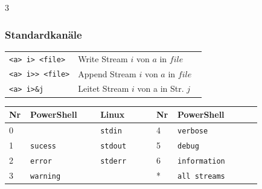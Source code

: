 \documentclass[
11pt,
footheight=40pt
]{scrartcl}
\newif\ifdateisysteme \dateisystemetrue
\newif\ifkanaele \kanaeletrue
\begin{document}
\begin{paracol}{3}
	\ifkanaele 
	\subsubsection*{Standardkanäle}
		\begin{tabular}{p{0.35\linewidth} p{0.65\linewidth}}
		\rowcolor{lightpeach} \texttt{<a> i> <file>} & Write Stream $i$ von $a$ in $file$ \\
		\rowcolor{lightpeach} \texttt{<a> i>> <file>} & Append Stream $i$ von $a$ in $file$ \\
		\texttt{<a> i>\&j} & Leitet Stream $i$ von a in Str. $j$ \\
	\end{tabular}

	\begin{tabular}{p{0.04\linewidth} p{0.25\linewidth} p{0.20\linewidth} || p{0.04\linewidth} p{0.30\linewidth}}
		\textbf{Nr} & \textbf{PowerShell}  & \textbf{Linux} & \textbf{Nr} & \textbf{PowerShell} \\ \hline
	    \rowcolor{lightpeach} 0 &  & \texttt{stdin} & 4 & \texttt{verbose}\\
	    1 & \texttt{sucess} & \texttt{stdout}  & 5 & \texttt{debug}\\
	    \rowcolor{lightpeach} 2 & \texttt{error} & \texttt{stderr} & 6 & \texttt{information}\\
	    3 & \texttt{warning}  &  & * & \texttt{all streams}\\
	\end{tabular}
	\fi
	
	\newpage
	\switchcolumn
		\ifdateisysteme

\end{paracol}
\end{document}
